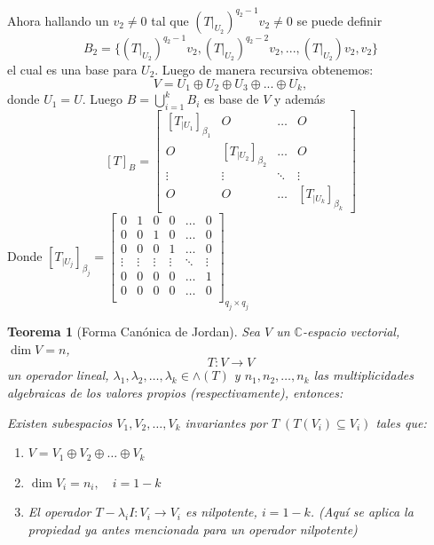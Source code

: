\documentclass[12pt,a4paper]{article}
\newtheorem{mytheo}{Teorema}[section]
\begin{document}
\begin{multicols}{2}
	Ahora hallando un $v_{2}\neq0$ tal que $ (T|_{U_{2}})^{q_{2}-1}v_{2}\neq 0$  se puede definir
	$$B_{2}=\{(T|_{U_{2}})^{q_{2}-1}v_{2}, (T|_{U_{2}})^{q_{2}-2}v_{2}, ..., (T|_{U_{2}})v_{2},v_{2} \}$$ el cual es una base para $U_{2}$. Luego de manera recursiva obtenemos: \\
	$$V=U_{1}\oplus U_{2}\oplus U_{3}\oplus ... \oplus U_{k},$$ donde $U_{1}=U$. Luego $B=\displaystyle\bigcup\limits_{i=1}^{k}B_{i} $ es base de $V$ y además \\
	$$\left [T\right]_{B}=\begin{bmatrix}
	\left[T_{|U_{1}}\right]_{\beta_{1}}	&	O	&	\ldots	&	O\\
	O	&	\left[T_{|U_{2}}\right]_{\beta_{2}}	&	\ldots	&	O\\
	\vdots	&	\vdots	& \ddots	& \vdots\\
	O	&	O	&	\ldots	&	\left[T_{|U_{k}}\right]_{\beta_{k}}
	\end{bmatrix}$$
	Donde 	$\left[T_{|U_{j}}\right]_{\beta_{j}}=\begin{bmatrix}
	0	&	1	&	0	&	0	&	\ldots	&	0\\
	0	&	0	&	1	&	0	&	\ldots	&	0\\
	0	&	0	&	0	&	1	&	\ldots	&	0\\
	\vdots	&	\vdots	&	\vdots	&	\vdots	&	\ddots	&	\vdots\\
	0	&	0	&	0	&	0	&	\ldots	&	1\\
	0	&	0	&	0	&	0	&	\ldots	&	0\\
	\end{bmatrix}_{q_{j}\times q_{j}}$
	
	\vspace{0.7cm}
	
	\begin{mytheo}[Forma Canónica de Jordan]
		Sea $V$ un $\mathbb{C}$-espacio vectorial, $\dim V = n$, $$T:V\rightarrow V$$ un operador lineal, $\lambda_{1},\lambda_{2},\ldots,\lambda_{k}\in \wedge(T)$ y $n_{1}, n_{2},\ldots , n_{k}$ las multiplicidades algebraicas de los valores propios (respectivamente), entonces:
		
		Existen subespacios $V_{1}, V_{2},\ldots, V_{k}$ invariantes por $T\;\left(T(V_{i})\subseteq V_{i}\right)$ tales que:
		\begin{enumerate}
			\item	$V = V_{1}\oplus V_{2}\oplus\ldots\oplus V_{k}$
			\item $\dim V_{i} = n_{i},\quad i=1-k$
			\item El operador $T-\lambda_{i}I:V_{i}\rightarrow V_{i}$ es nilpotente, $i=1-k$. (Aquí se aplica la propiedad ya antes mencionada para un operador nilpotente)
			

\end{enumerate}
\end{mytheo}
\end{multicols}
\end{document}
